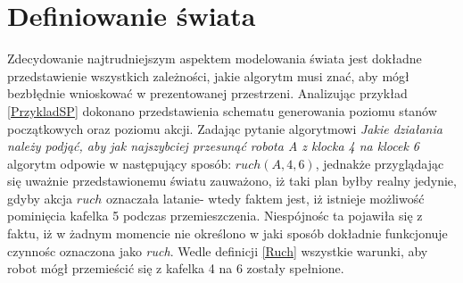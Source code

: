 \section{Definiowanie świata}
    \label{DefinicjeSwiata}
    Zdecydowanie najtrudniejszym aspektem modelowania świata jest dokładne przedstawienie wszystkich zależności, jakie algorytm musi znać,
    aby mógł bezbłędnie wnioskować w prezentowanej przestrzeni. Analizując przykład \ref{PrzykladSP} dokonano przedstawienia schematu 
    generowania poziomu stanów początkowych oraz poziomu akcji. Zadając pytanie algorytmowi \textit{Jakie działania należy podjąć, aby jak najszybciej
    przesunąć robota A z klocka 4 na klocek 6} algorytm odpowie w następujący sposób: $ruch(A,4,6)$, jednakże przyglądając się uważnie przedstawionemu światu 
    zauważono, iż taki plan byłby realny jedynie, gdyby akcja $ruch$ oznaczała latanie- wtedy faktem jest, iż istnieje możliwość pominięcia kafelka 5 podczas 
    przemieszczenia. Niespójnośc ta pojawiła się z faktu, iż w żadnym momencie nie określono w jaki sposób dokładnie funkcjonuje czynnośc oznaczona jako \textit{ruch}.
    Wedle definicji \ref{Ruch} wszystkie warunki, aby robot mógł przemieścić się z kafelka 4 na 6 zostały spełnione.

